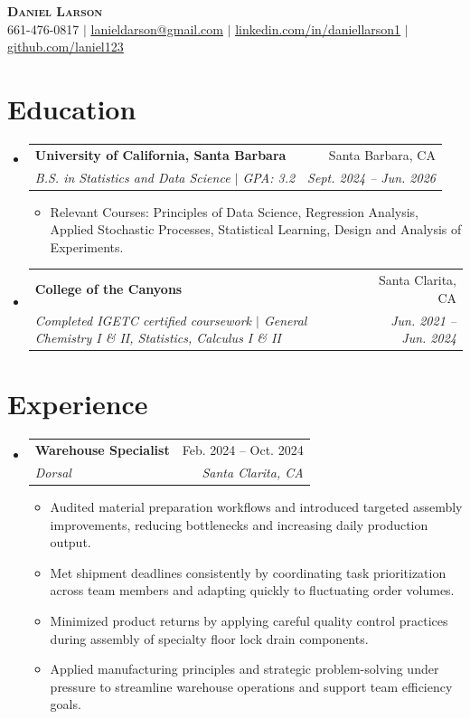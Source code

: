 \documentclass[letterpaper,11pt]{article}
\makeatletter
\newcommand{\resumeItem}[1]{
  \item\small{
    {#1 \vspace{-2pt}}
  }
}
\newcommand{\resumeSubheading}[4]{
  \vspace{-2pt}\item
    \begin{tabular*}{0.97\textwidth}[t]{l@{\extracolsep{\fill}}r}
      \textbf{#1} & #2 \\
      \textit{\small#3} & \textit{\small #4} \\
    \end{tabular*}\vspace{-7pt}
}
\newcommand{\resumeSubHeadingListStart}{\begin{itemize}[leftmargin=0.15in, label={}]}
\newcommand{\resumeSubHeadingListEnd}{\end{itemize}}
\newcommand{\resumeItemListStart}{\begin{itemize}}
\newcommand{\resumeItemListEnd}{\end{itemize}\vspace{-5pt}}
\makeatother
\begin{document}
 
\begin{center}
    \textbf{\Huge \scshape Daniel Larson} \\ \vspace{1pt}
    \small 661-476-0817 $|$ \href{mailto:lanieldarson@gmail.com}{\underline{lanieldarson@gmail.com}} $|$
    \href{https://www.linkedin.com/in/daniellarson1}{\underline{linkedin.com/in/daniellarson1}} $|$
    \href{https://github.com/laniel123}{\underline{github.com/laniel123}}
\end{center}
 
\section{Education}
  \resumeSubHeadingListStart
    \resumeSubheading
      {University of California, Santa Barbara}{Santa Barbara, CA}
      {B.S. in Statistics and Data Science $|$ GPA: 3.2}{Sept. 2024 -- Jun. 2026}
      \resumeItemListStart
        \resumeItem{Relevant Courses: Principles of Data Science, Regression Analysis, Applied Stochastic Processes, Statistical Learning, Design and Analysis of Experiments.}
      \resumeItemListEnd
      \resumeSubheading
      {College of the Canyons}{Santa Clarita, CA}
      {Completed IGETC certified coursework $|$ General Chemistry I \& II, Statistics, Calculus I \& II}{Jun. 2021 -- Jun. 2024}
      \resumeSubHeadingListEnd
      
\section{Experience}
  \resumeSubHeadingListStart
    \resumeSubheading
      {Warehouse Specialist}{Feb. 2024 -- Oct. 2024}
      {Dorsal}{Santa Clarita, CA}
      \resumeItemListStart
        \resumeItem{Audited material preparation workflows and introduced targeted assembly improvements, reducing bottlenecks and increasing daily production output.}
        \resumeItem{Met shipment deadlines consistently by coordinating task prioritization across team members and adapting quickly to fluctuating order volumes.}
        \resumeItem{Minimized product returns by applying careful quality control practices during assembly of specialty floor lock drain components.}
        \resumeItem{Applied manufacturing principles and strategic problem-solving under pressure to streamline warehouse operations and support team efficiency goals.}
      \resumeItemListEnd
  \resumeSubHeadingListEnd
\end{document}
